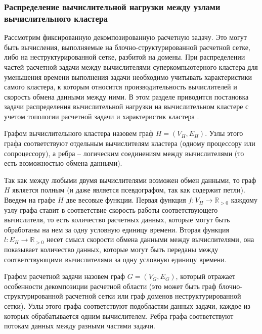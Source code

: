 \subsubsection{Распределение вычислительной нагрузки между узлами \mbox{вычислительного} кластера}\label{sec:text_2_getero}

Рассмотрим фиксированную декомпозированную расчетную задачу.
Это могут быть вычисления, выполняемые на блочно-структурированной расчетной сетке, либо на неструктурированной сетке, разбитой на домены.
При распределении частей расчетной задачи между вычислителями суперкомпьютерного кластера для уменьшения времени выполнения задачи необходимо учитывать характеристики самого кластера, к которым относится производительность вычислителей и скорость обмена данными между ними.
В этом разделе приводится постановка задачи распределения вычислительной нагрузки на вычислительном кластере с учетом топологии расчетной задачи и характеристик кластера \cite{Rybakov2018Distr,Rybakov2017Part}.

\begin{definition}
Графом вычислительного кластера назовем граф $H = (V_H, E_H)$.
Узлы этого графа соответствуют отдельным вычислителям кластера (одному процессору или сопроцессору), а ребра -- логическим соединениям между вычислителями (то есть возможностью обмена данными).
\end{definition}

Так как между любыми двумя вычислителями возможен обмен данными, то граф $H$ является полным (и даже является псевдографом, так как содержит петли).
Введем на графе $H$ две весовые функции.
Первая функция $f: V_H \rightarrow \mathbb{R}_{> 0}$ каждому узлу графа ставит в соответствие скорость работы соответствующего вычислителя, то есть количество расчетных данных, которые могут быть обработаны на нем за одну условную единицу времени.
Вторая функция $l: E_H \rightarrow \mathbb{R}_{> 0}$ несет смысл скорости обмена данными между вычислителями, она показывает количество данных, которые могут быть переданы между соответствующими вычислителями за одну условную единицу времени.

\begin{definition}
Графом расчетной задачи назовем граф $G = (V_G, E_G)$, который отражает особенности декомпозиции расчетной области (это может быть граф блочно-структурированной расчетной сетки или граф доменов неструктурированной сетки).
Узлы этого графа соответствуют подобластям данных задачи, каждое из которых обрабатывается одним вычислителем.
Ребра графа соответствуют потокам данных между разными частями задачи.
\end{definition}


